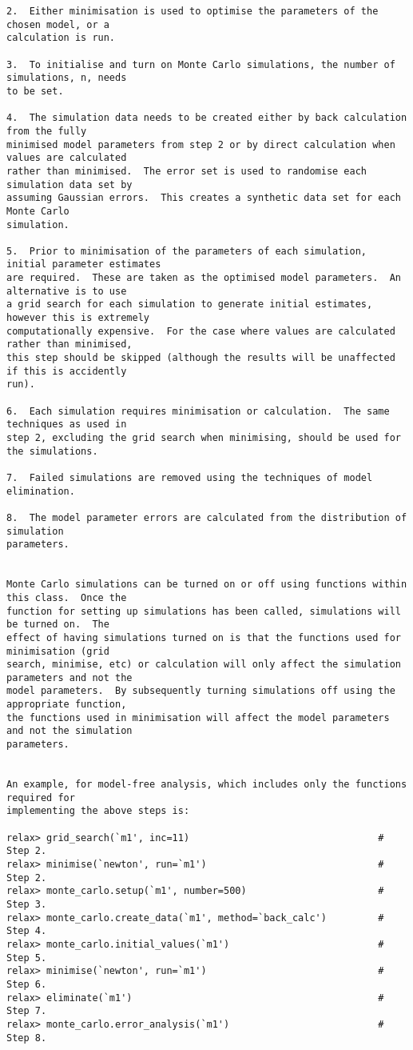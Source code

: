 {\begin{verbatim}
2.  Either minimisation is used to optimise the parameters of the chosen model, or a
calculation is run.

3.  To initialise and turn on Monte Carlo simulations, the number of simulations, n, needs
to be set.

4.  The simulation data needs to be created either by back calculation from the fully
minimised model parameters from step 2 or by direct calculation when values are calculated
rather than minimised.  The error set is used to randomise each simulation data set by
assuming Gaussian errors.  This creates a synthetic data set for each Monte Carlo
simulation.

5.  Prior to minimisation of the parameters of each simulation, initial parameter estimates
are required.  These are taken as the optimised model parameters.  An alternative is to use
a grid search for each simulation to generate initial estimates, however this is extremely
computationally expensive.  For the case where values are calculated rather than minimised,
this step should be skipped (although the results will be unaffected if this is accidently
run).

6.  Each simulation requires minimisation or calculation.  The same techniques as used in
step 2, excluding the grid search when minimising, should be used for the simulations.

7.  Failed simulations are removed using the techniques of model elimination.

8.  The model parameter errors are calculated from the distribution of simulation
parameters.


Monte Carlo simulations can be turned on or off using functions within this class.  Once the
function for setting up simulations has been called, simulations will be turned on.  The
effect of having simulations turned on is that the functions used for minimisation (grid
search, minimise, etc) or calculation will only affect the simulation parameters and not the
model parameters.  By subsequently turning simulations off using the appropriate function,
the functions used in minimisation will affect the model parameters and not the simulation
parameters.


An example, for model-free analysis, which includes only the functions required for
implementing the above steps is:

relax> grid_search(`m1', inc=11)                                 # Step 2.
relax> minimise(`newton', run=`m1')                              # Step 2.
relax> monte_carlo.setup(`m1', number=500)                       # Step 3.
relax> monte_carlo.create_data(`m1', method=`back_calc')         # Step 4.
relax> monte_carlo.initial_values(`m1')                          # Step 5.
relax> minimise(`newton', run=`m1')                              # Step 6.
relax> eliminate(`m1')                                           # Step 7.
relax> monte_carlo.error_analysis(`m1')                          # Step 8.


\end{verbatim}}
